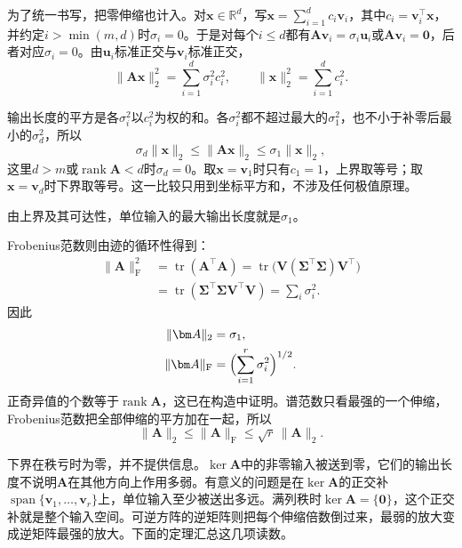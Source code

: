 为了统一书写，把零伸缩也计入。对$\bm x\in\mathbb R^d$，写$\bm x=\sum_{i=1}^dc_i\bm v_i$，其中$c_i=\bm v_i^\top\bm x$，并约定$i>\min(m,d)$时$\sigma_i=0$。于是对每个$i\leq d$都有$\bm A\bm v_i=\sigma_i\bm u_i$或$\bm A\bm v_i=\bm0$，后者对应$\sigma_i=0$。由$\bm u_i$标准正交与$\bm v_i$标准正交，
\begin{equation}
 \lVert\bm A\bm x\rVert_2^2=\sum_{i=1}^d\sigma_i^2c_i^2,\qquad
 \lVert\bm x\rVert_2^2=\sum_{i=1}^dc_i^2 .
 \label{eq:svd-output-length}
\end{equation}

输出长度的平方是各$\sigma_i^2$以$c_i^2$为权的和。各$\sigma_i^2$都不超过最大的$\sigma_1^2$，也不小于补零后最小的$\sigma_d^2$，所以
\[
 \sigma_d\lVert\bm x\rVert_2\leq\lVert\bm A\bm x\rVert_2\leq\sigma_1\lVert\bm x\rVert_2 ,
\]
这里$d>m$或$\operatorname{rank}\bm A<d$时$\sigma_d=0$。取$\bm x=\bm v_1$时只有$c_1=1$，上界取等号；取$\bm x=\bm v_d$时下界取等号。这一比较只用到坐标平方和，不涉及任何极值原理。

由上界及其可达性，单位输入的最大输出长度就是$\sigma_1$。

Frobenius范数则由迹的循环性得到：
\[
 \begin{aligned}
 \lVert\bm A\rVert_{\mathrm F}^2&=\operatorname{tr}(\bm A^\top\bm A)=\operatorname{tr}\bigl(\bm V(\bm\Sigma^\top\bm\Sigma)\bm V^\top\bigr)\\
 &=\operatorname{tr}(\bm\Sigma^\top\bm\Sigma\bm V^\top\bm V)=\sum_i\sigma_i^2 .
 \end{aligned}
\]
因此
\begin{align}
 \lVert\bm A\rVert_2&=\sigma_1,
 \label{eq:matrix-analysis-spectral-norm}\\
 \lVert\bm A\rVert_{\mathrm F}&=\Bigl(\sum_{i=1}^r\sigma_i^2\Bigr)^{1/2}.
 \label{eq:matrix-analysis-frobenius-norm}
\end{align}
正奇异值的个数等于$\operatorname{rank}\bm A$，这已在构造中证明。谱范数只看最强的一个伸缩，Frobenius范数把全部伸缩的平方加在一起，所以
\[
 \lVert\bm A\rVert_2\leq\lVert\bm A\rVert_{\mathrm F}\leq\sqrt r\,\lVert\bm A\rVert_2 .
\]

下界在秩亏时为零，并不提供信息。$\ker\bm A$中的非零输入被送到零，它们的输出长度不说明$\bm A$在其他方向上作用多弱。有意义的问题是在$\ker\bm A$的正交补$\operatorname{span}\{\bm v_1,\ldots,\bm v_r\}$上，单位输入至少被送出多远。满列秩时$\ker\bm A=\{\bm0\}$，这个正交补就是整个输入空间。可逆方阵的逆矩阵则把每个伸缩倍数倒过来，最弱的放大变成逆矩阵最强的放大。下面的定理汇总这几项读数。

